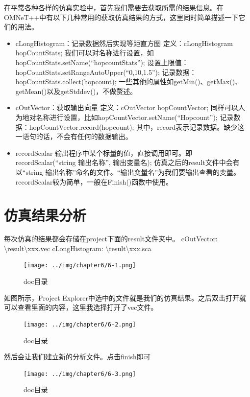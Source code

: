 在平常各种各样的仿真实验中，首先我们需要去获取所需的结果信息。在OMNeT++中有以下几种常用的获取仿真结果的方式，这里同时简单描述一下它们的用法。

\begin{itemize}
\item cLongHistogram：记录数据然后实现等距直方图 
定义：cLongHistogram hopCountStats;
我们可以对名称进行设置，如hopCountStats.setName(“hopcountStats”);
设置上限值：hopCountStats.setRangeAutoUpper(“0,10,1.5”);
记录数据：hopCountStats.collect(hopcount);
一些其他的属性如getMin()、getMax()、getMean()以及getStddev()，不做赘述。

\item cOutVector：获取输出向量
定义：cOutVector hopCountVector;
同样可以人为地对名称进行设置，比如hopCountVector.setName(“Hopcount”);
记录数据：hopCountVector.record(hopcount);
其中，record表示记录数据。缺少这一语句的话，不会有任何的数据输出。

\item recordScalar
输出程序中某个标量的值，直接调用即可。即
recordScalar(“string 输出名称”, 输出变量名);
仿真之后的result文件中会有以“string 输出名称”命名的文件。“输出变量名”为我们要输出查看的变量。recordScalar较为简单，一般在Finish()函数中使用。

\end{itemize}

\section{仿真结果分析}
\label{仿真结果分析}

每次仿真的结果都会存储在project下面的result文件夹中。
cOutVector: \textbackslash{}result\textbackslash{}xxx.vec
cLongHistogram: \textbackslash{}result\textbackslash{}xxx.sca

\begin{figure}[htbp]
\centering
\texttt{[image: ../img/chapter6/6-1.png]}
\caption{doc目录}
\end{figure}

如图所示，Project Explorer中选中的文件就是我们的仿真结果。之后双击打开就可以查看里面的内容，这里我选择打开了vec文件。

\begin{figure}[htbp]
\centering
\texttt{[image: ../img/chapter6/6-2.png]}
\caption{doc目录}
\end{figure}

然后会让我们建立新的分析文件。点击finish即可

\begin{figure}[htbp]
\centering
\texttt{[image: ../img/chapter6/6-3.png]}
\caption{doc目录}
\end{figure}

